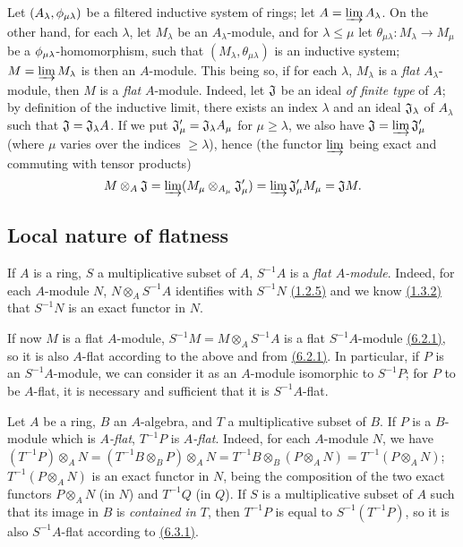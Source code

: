 \begin{env}[6.2.3]
\label{0.6.2.3}
Let $(A_\lambda,\phi_{\mu\lambda})$ be a filtered inductive system of rings;
let $A=\varinjlim A_\lambda$. On the other hand, for each $\lambda$, let
$M_\lambda$ be an $A_\lambda$-module, and for $\lambda\leqslant\mu$ let
$\theta_{\mu\lambda}:M_\lambda\to M_\mu$ be a $\phi_{\mu\lambda}$-homomorphism,
such that $(M_\lambda,\theta_{\mu\lambda})$ is an inductive system;
$M=\varinjlim M_\lambda$ is then an $A$-module. This being so, if for each
$\lambda$, $M_\lambda$ is a {\em flat} $A_\lambda$-module, then $M$ is a
{\em flat} $A$-module. Indeed, let $\mathfrak{J}$ be an ideal {\em of finite
type} of $A$; by definition of the inductive limit, there exists an index
$\lambda$ and an ideal $\mathfrak{J}_\lambda$ of $A_\lambda$ such that
$\mathfrak{J}=\mathfrak{J}_\lambda A$. If we put
$\mathfrak{J}_\mu'=\mathfrak{J}_\lambda A_\mu$ for $\mu\geqslant\lambda$, we
also have $\mathfrak{J}=\varinjlim\mathfrak{J}_\mu'$ (where $\mu$ varies over
the indices $\geqslant\lambda$), hence (the functor $\varinjlim$ being exact and
commuting with tensor products)
\[
  M\otimes_A\mathfrak{J}=\varinjlim(M_\mu\otimes_{A_\mu}\mathfrak{J}_\mu')
  =\varinjlim\mathfrak{J}_\mu' M_\mu=\mathfrak{J}M.
\]
\end{env}

\subsection{Local nature of flatness}
\label{subsection-local-nature-of-flatness}

\begin{env}[6.3.1]
\label{0.6.3.1}
If $A$ is a ring, $S$ a multiplicative subset of $A$, $S^{-1}A$ is a {\em flat
$A$-module}. Indeed, for each $A$-module $N$, $N\otimes_A S^{-1}A$ identifies
with $S^{-1}N$ \hyperref[0.1.2.5]{(1.2.5)} and we know \hyperref[0.1.3.2]{(1.3.2)}
that $S^{-1}N$ is an exact functor in $N$.

If now $M$ is a flat $A$-module, $S^{-1}M=M\otimes_A S^{-1}A$ is a flat
$S^{-1}A$-module \hyperref[0.6.2.1]{(6.2.1)}, so it is also $A$-flat according to the
above and from \hyperref[0.6.2.1]{(6.2.1)}. In particular, if $P$ is an $S^{-1}A$-module,
we can consider it as an $A$-module isomorphic to $S^{-1}P$; for $P$ to be
$A$-flat, it is necessary and sufficient that it is $S^{-1}A$-flat.
\end{env}

\begin{env}[6.3.2]
\label{0.6.3.2}
Let $A$ be a ring, $B$ an $A$-algebra, and $T$ a multiplicative subset of $B$.
If $P$ is a $B$-module which is {\em $A$-flat}, $T^{-1}P$ is {\em $A$-flat}.
Indeed, for each $A$-module $N$, we have
$(T^{-1}P)\otimes_A N=(T^{-1}B\otimes_B P)\otimes_A N
  =T^{-1}B\otimes_B(P\otimes_A N)
  =T^{-1}(P\otimes_A N)$; $T^{-1}(P\otimes_A N)$ is an exact functor in $N$,
being the composition of the two exact functors $P\otimes_A N$ (in $N$) and
$T^{-1}Q$ (in $Q$). If $S$ is a multiplicative subset of $A$ such that its image
in $B$ is {\em contained in $T$}, then $T^{-1}P$ is equal to $S^{-1}(T^{-1}P)$,
so it is also $S^{-1}A$-flat according to \hyperref[0.6.3.1]{(6.3.1)}.
\end{env}

